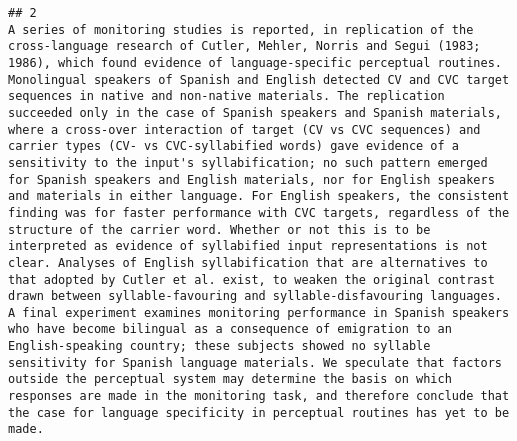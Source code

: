 \documentclass[
  english,
  man]{apa6}
\begin{document}
\begin{verbatim}
## 2                                                                                                                                                                                                                                                                                                                                                                                                                                                                                                                                                                                                                                                                                                                                                                                                                                                                                                                                                                                  A series of monitoring studies is reported, in replication of the cross-language research of Cutler, Mehler, Norris and Segui (1983; 1986), which found evidence of language-specific perceptual routines. Monolingual speakers of Spanish and English detected CV and CVC target sequences in native and non-native materials. The replication succeeded only in the case of Spanish speakers and Spanish materials, where a cross-over interaction of target (CV vs CVC sequences) and carrier types (CV- vs CVC-syllabified words) gave evidence of a sensitivity to the input's syllabification; no such pattern emerged for Spanish speakers and English materials, nor for English speakers and materials in either language. For English speakers, the consistent finding was for faster performance with CVC targets, regardless of the structure of the carrier word. Whether or not this is to be interpreted as evidence of syllabified input representations is not clear. Analyses of English syllabification that are alternatives to that adopted by Cutler et al. exist, to weaken the original contrast drawn between syllable-favouring and syllable-disfavouring languages. A final experiment examines monitoring performance in Spanish speakers who have become bilingual as a consequence of emigration to an English-speaking country; these subjects showed no syllable sensitivity for Spanish language materials. We speculate that factors outside the perceptual system may determine the basis on which responses are made in the monitoring task, and therefore conclude that the case for language specificity in perceptual routines has yet to be made.

\end{verbatim}
\end{document}

